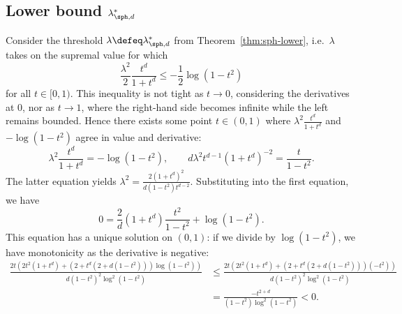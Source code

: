 \documentclass{article}
\begin{document}
\subsection{Lower bound $\lambda^*_{\sph,d}$}
Consider the threshold $\lambda \defeq \lambda^*_{\sph,d}$ from Theorem~\ref{thm:sph-lower}, i.e.\
$\lambda$ takes on the supremal value for which
$$\frac{\lambda^2}{2} \frac{t^d}{1+t^d} \leq -\frac12 \log(1-t^2)$$
for all $t \in [0,1)$. This inequality is not tight as $t \to 0$, considering the derivatives at $0$, nor as $t \to 1$, where the right-hand side becomes infinite while the left remains bounded. Hence there exists some point $t \in (0,1)$ where $\lambda^2 \frac{t^d}{1+t^d}$ and $-\log(1-t^2)$ agree in value and derivative:
$$ \lambda^2 \frac{t^d}{1+t^d} = - \log(1-t^2), \qquad d \lambda^2 t^{d-1} (1+t^d)^{-2} = \frac{t}{1-t^2}. $$
The latter equation yields $\lambda^2 = \frac{2 (1+t^d)^2}{d(1-t^2)t^{d-2}}$. Substituting into the first equation, we have
\begin{equation} 0 = \frac{2}{d} (1+t^d) \frac{t^2}{1-t^2} + \log(1-t^2). \label{eq:sph-problem}\end{equation}
This equation has a unique solution on $(0,1)$: if we divide by $\log(1-t^2)$, we have monotonicity as the derivative is negative:
\begin{align*}
\frac{2t(2t^2(1+t^d)+(2+t^d(2+d(1-t^2)))\log(1-t^2))}{d(1-t^2)^2 \log^2(1-t^2)} &\leq \frac{2t(2t^2(1+t^d)+(2+t^d(2+d(1-t^2)))(-t^2))}{d(1-t^2)^2 \log^2(1-t^2)} \\
&= \frac{-t^{2+d}}{(1-t^2)\log^2(1-t^2)} < 0.
\end{align*}
\end{document}
